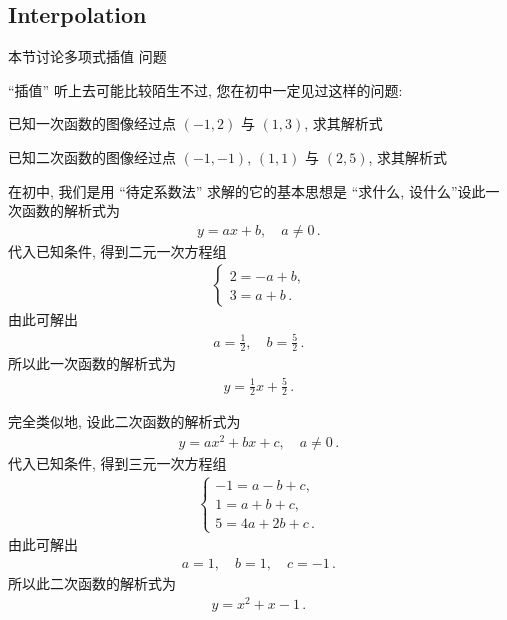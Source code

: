 \subsection*{Interpolation}

本节讨论多项式插值  问题\period

``插值'' 听上去可能比较陌生\period 不过, 您在初中一定见过这样的问题:

\begin{example}
    已知一次函数的图像经过点 $(-1,2)$ 与 $(1,3)$, 求其解析式\period
\end{example}

\begin{example}
    已知二次函数的图像经过点 $(-1,-1)$, $(1,1)$ 与 $(2,5)$, 求其解析式\period
\end{example}

在初中, 我们是用 ``待定系数法''  求解的\period 它的基本思想是 ``求什么, 设什么''\period 设此一次函数的解析式为
\begin{align*}
    y = ax + b, \quad a \neq 0 \period
\end{align*}
代入已知条件, 得到二元一次方程组
\begin{align*}
    \begin{cases}
        2 = -a + b, \\
        3 = a + b \period
    \end{cases}
\end{align*}
由此可解出
\begin{align*}
    a = \frac12, \quad b = \frac52 \period
\end{align*}
所以此一次函数的解析式为
\begin{align*}
    y = \frac12 x + \frac52 \period
\end{align*}

完全类似地, 设此二次函数的解析式为
\begin{align*}
    y = ax^2 + bx + c, \quad a \neq 0 \period
\end{align*}
代入已知条件, 得到三元一次方程组
\begin{align*}
    \begin{cases}
        -1 = a - b + c, \\
        1 = a + b + c,  \\
        5 = 4a + 2b + c \period
    \end{cases}
\end{align*}
由此可解出
\begin{align*}
    a = 1, \quad b = 1, \quad c = -1 \period
\end{align*}
所以此二次函数的解析式为
\begin{align*}
    y = x^2 + x - 1 \period
\end{align*}

